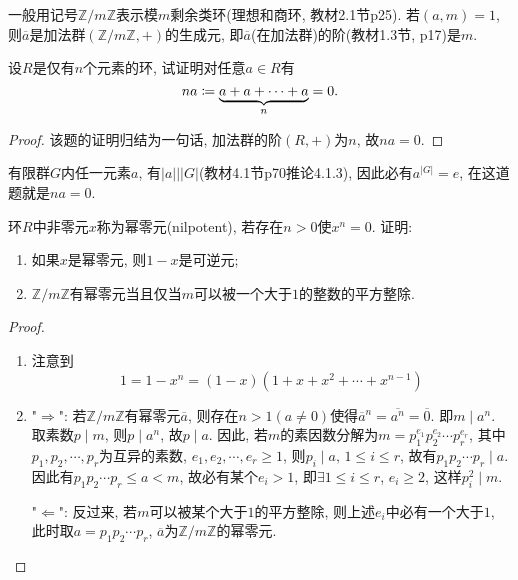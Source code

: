 \begin{remark}
    一般用记号$\mathbb{Z}/m\mathbb{Z}$表示模$m$剩余类环(理想和商环, 教材2.1节p25). 若$(a, m) = 1$, 则$\overline{a}$是加法群$(\mathbb{Z}/m\mathbb{Z}, +)$的生成元, 即$\overline{a}$(在加法群)的阶(教材1.3节, p17)是$m$.
\end{remark}

\begin{problem}
    设$R$是仅有$n$个元素的环, 试证明对任意$a \in R$有
    \[
        na \mathrel{\coloneqq} \underbrace{a + a + \cdots + a}_n = 0.
    \]
\end{problem}
    
\begin{proof}
    该题的证明归结为一句话, 加法群的阶$(R, +)$为$n$, 故$na = 0$.
\end{proof}

\begin{remark}
    有限群$G$内任一元素$a$, 有$|a| \Big| |G|$(教材4.1节p70推论4.1.3), 因此必有$a^{|G|} = e$, 在这道题就是$na = 0$.
\end{remark}

\begin{problem}
    环$R$中非零元$x$称为幂零元(nilpotent), 若存在$n > 0$使$x^n = 0$. 证明:
    \begin{enumerate}[(1)]
        \item 如果$x$是幂零元, 则$1 - x$是可逆元;
        \item $\mathbb{Z}/m\mathbb{Z}$有幂零元当且仅当$m$可以被一个大于$1$的整数的平方整除.
    \end{enumerate}
\end{problem}

\begin{proof}
    \begin{enumerate}[(1)]
        \item 注意到
        \[
            1 = 1 - x^n = (1 - x)(1 + x + x^2 + \cdots + x^{n - 1})
        \]
        \item "$\Rightarrow$": 若$\mathbb{Z}/m\mathbb{Z}$有幂零元$\overline{a}$, 则存在$n > 1(a \neq 0)$使得$\overline{a}^n = \overline{a^n} = \overline{0}$. 即$m \mid a^n$. 取素数$p \mid m$, 则$p \mid a^n$, 故$p \mid a$. 因此, 若$m$的素因数分解为$m = p_1^{e_1}p_2^{e_2}\cdots p_r^{e_r}$, 其中$p_1, p_2, \cdots, p_r$为互异的素数, $e_1, e_2, \cdots, e_r \geqslant 1$, 则$p_i \mid a,\, 1 \leqslant i \leqslant r$, 故有$p_1p_2\cdots p_r \mid a$. 因此有$p_1p_2\cdots p_r \leqslant a < m$, 故必有某个$e_i > 1$, 即$\exists 1 \leqslant i \leqslant r$, $e_i \geqslant 2$, 这样$p_i^2 \mid m$.
        
        "$\Leftarrow$": 反过来, 若$m$可以被某个大于$1$的平方整除, 则上述$e_i$中必有一个大于$1$, 此时取$a = p_1p_2\cdots p_r$, $\overline{a}$为$\mathbb{Z}/m\mathbb{Z}$的幂零元.
    \end{enumerate}
\end{proof}

